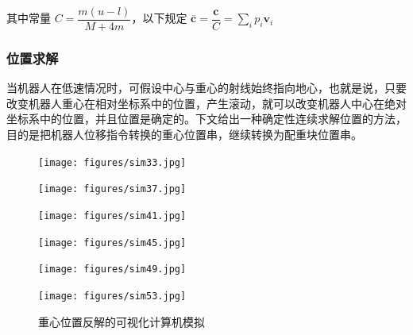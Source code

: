 \documentclass[a4paper]{ctexart}
\numberwithin{equation}{section}
\numberwithin{table}{section}
\numberwithin{figure}{section}
\begin{document}
其中常量 $C=\dfrac{m (u-l)}{M + 4m}$，以下规定 $\overline{\boldsymbol c} = \dfrac{\boldsymbol c}{C} = \sum_i p_i \boldsymbol v_i$

\subsubsection{位置求解}

当机器人在低速情况时，可假设中心与重心的射线始终指向地心，也就是说，只要改变机器人重心在相对坐标系中的位置，产生滚动，就可以改变机器人中心在绝对坐标系中的位置，并且位置是确定的。下文给出一种确定性连续求解位置的方法，目的是把机器人位移指令转换的重心位置串，继续转换为配重块位置串。


\begin{figure}[H]
  \begin{minipage}{0.32\linewidth}
    \begin{center}
      \texttt{[image: figures/sim33.jpg]}
    \end{center}
  \end{minipage}
  \hfill
  \begin{minipage}{0.32\linewidth}
    \begin{center}
      \texttt{[image: figures/sim37.jpg]}
    \end{center}
  \end{minipage}
  \hfill
  \begin{minipage}{0.32\linewidth}
    \begin{center}
      \texttt{[image: figures/sim41.jpg]}
    \end{center}
  \end{minipage}
  \vfill
  \begin{minipage}{0.32\linewidth}
    \begin{center}
      \texttt{[image: figures/sim45.jpg]}
    \end{center}
  \end{minipage}
  \hfill
  \begin{minipage}{0.32\linewidth}
    \begin{center}
      \texttt{[image: figures/sim49.jpg]}
    \end{center}
  \end{minipage}
  \hfill
  \begin{minipage}{0.32\linewidth}
    \begin{center}
      \texttt{[image: figures/sim53.jpg]}
    \end{center}
  \end{minipage}
  \caption{重心位置反解的可视化计算机模拟}
\end{figure}
\end{document}
